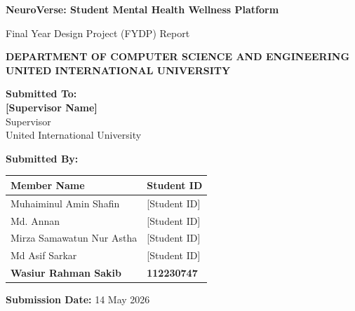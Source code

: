 \documentclass[a4paper,11pt]{report}
\begin{document}

\begin{titlepage}
    \begin{center}
        \vspace*{0.5cm} 
        
        \Huge
        \textbf{NeuroVerse: Student Mental Health Wellness Platform}
        
        \vspace{0.8cm}
        \Large
        Final Year Design Project (FYDP) Report
        
        \vspace{1.2cm}
        \large
        \textbf{DEPARTMENT OF COMPUTER SCIENCE AND ENGINEERING}\\
        \textbf{UNITED INTERNATIONAL UNIVERSITY}
        
        \vspace{1.5cm}
        
        \large
        \textbf{Submitted To:}\\
        \vspace{0.2cm}
        \normalsize
        \textbf{[Supervisor Name]}\\
        Supervisor\\
        United International University
        
        \vspace{1.5cm}
        
        \large
        \textbf{Submitted By:}\\
        \vspace{0.3cm}
        \normalsize
        \begin{tabular}{ll}
            \toprule
            \textbf{Member Name} & \textbf{Student ID} \\
            \midrule
            Muhaiminul Amin Shafin & [Student ID] \\
            Md. Annan & [Student ID] \\
            Mirza Samawatun Nur Astha & [Student ID] \\
            Md Asif Sarkar & [Student ID] \\
            \textbf{Wasiur Rahman Sakib} & \textbf{112230747} \\
            \bottomrule
        \end{tabular}
        
        \vfill 
        
        \large
        \textbf{Submission Date:} 14 May 2026
    \end{center}
\end{titlepage}
\end{document}
